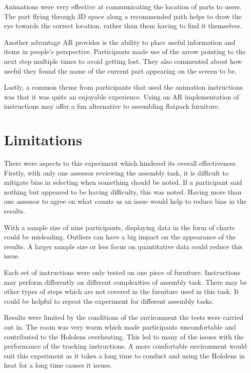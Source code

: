 \documentclass{l4proj}
\begin{document}
Animations were very effective at communicating the location of parts to users. The part flying through 3D space along a recommended path helps to draw the eye towards the correct location, rather than them having to find it themselves.

Another advantage AR provides is the ability to place useful information and items in people's perspective. Participants made use of the arrow pointing to the next step multiple times to avoid getting lost. They also commented about how useful they found the name of the current part appearing on the screen to be.

Lastly, a common theme from participants that used the animation instructions was that it was quite an enjoyable experience. Using an AR implementation of instructions may offer a fun alternative to assembling flatpack furniture.

\section{Limitations}
\label{sec:exLimitations}

There were aspects to this experiment which hindered its overall effectiveness. Firstly, with only one assessor reviewing the assembly task, it is difficult to mitigate bias in selecting when something should be noted. If a participant said nothing but appeared to be having difficulty, this was noted. Having more than one assessor to agree on what counts as an issue would help to reduce bias in the results.

With a sample size of nine participants, displaying data in the form of charts could be misleading. Outliers can have a big impact on the appearance of the results. A larger sample size or less focus on quantitative data could reduce this issue.

Each set of instructions were only tested on one piece of furniture. Instructions may perform differently on different complexities of assembly task. There may be other types of steps which are not covered in the furniture used in this task. It could be helpful to repeat the experiment for different assembly tasks.

Results were limited by the conditions of the environment the tests were carried out in. The room was very warm which made participants uncomfortable and contributed to the Hololens overheating. This led to many of the issues with the performance of the tracking instructions. A more comfortable environment would suit this experiment as it takes a long time to conduct and using the Hololens in heat for a long time causes it issues.
\end{document}
